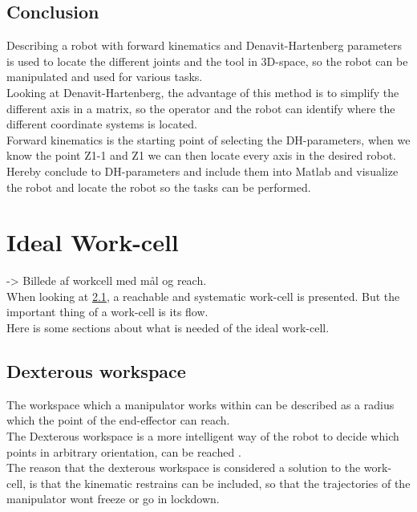 \section{Conclusion}

Describing a robot with forward kinematics and Denavit-Hartenberg parameters is used to locate the different joints and the tool in 3D-space, so the robot can be manipulated and used for various tasks.\\
Looking at Denavit-Hartenberg, the advantage of this method is to simplify the different axis in a matrix, so the operator and the robot can identify where the different coordinate systems is located.\\
Forward kinematics is the starting point of selecting the DH-parameters, when we know the point Z1-1 and Z1 we can then locate every axis in the desired robot. Hereby conclude to DH-parameters and include them into Matlab and visualize the robot and locate the robot so the tasks can be performed.\\

\chapter{Ideal Work-cell}\label{IdealWorkCell}

-> Billede af workcell med mål og reach.\\

When looking at \ref{}, a reachable and systematic work-cell is presented. But the important thing of a work-cell is its flow.\\
Here is some sections about what is needed of the ideal work-cell.

\section{Dexterous workspace}

The workspace which a manipulator works within can be described as a radius which the point of the end-effector can reach.\\
The Dexterous workspace is a more intelligent way of the robot to decide which points in arbitrary orientation, can be reached \cite{Dexterous}.\\
The reason that the dexterous workspace is considered a solution to the work-cell, is that the kinematic restrains can be included, so that the trajectories of the manipulator wont freeze or go in lockdown.\\


